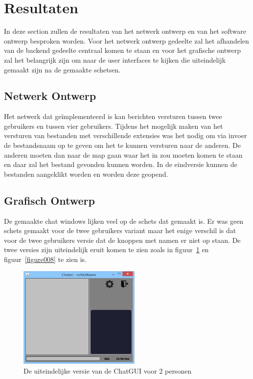 \documentclass[12pt]{article}
\begin{document}
\section{Resultaten}
In deze section zullen de resultaten van het netwerk ontwerp en van het software ontwerp besproken worden. Voor het netwerk ontwerp gedeelte zal het afhandelen van de backend gedeelte centraal komen te staan en voor het grafische ontwerp zal het belangrijk zijn om naar de user interfaces te kijken die uiteindelijk gemaakt zijn na de gemaakte schetsen. 

\subsection{Netwerk Ontwerp}
Het netwerk dat ge\"implementeerd is kan berichten versturen tussen twee gebruikers en tussen vier gebruikers. Tijdens het mogelijk maken van het versturen van bestanden met verschillende extensies was het nodig om via invoer de bestandsnaam op te geven om het te kunnen versturen naar de anderen. De anderen moeten dan naar de map gaan waar het in zou moeten komen te staan en daar zal het bestand gevonden kunnen worden. In de eindversie kunnen de bestanden aangeklikt worden en worden deze geopend.

\subsection{Grafisch Ontwerp}
De gemaakte chat windows lijken veel op de schets dat gemaakt is. Er was geen schets gemaakt voor de twee gebruikers variant maar het enige verschil is dat voor de twee gebruikers versie dat de knoppen met namen er niet op staan. De twee versies zijn uiteindelijk eruit komen te zien zoals in figuur~\ref{figure007} en figuur~\ref{figure008} te zien is.
\begin{figure}[ht]
\begin{center}
\includegraphics[width = 60mm]{chatser2}
\caption{De uiteindelijke versie van de ChatGUI voor 2 personen}
\label{figure007}
\end{center}
\end{figure}
\end{document}
